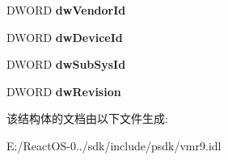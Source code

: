 \begin{DoxyCompactItemize}
\mbox{\label{struct___v_m_r9_monitor_info_a4c1ef7a750debebc2546b5e384e267a9}} 
D\+W\+O\+RD {\bfseries dw\+Vendor\+Id}
\item 
\mbox{\label{struct___v_m_r9_monitor_info_a08ee4c411e11696458145f2146f73a04}} 
D\+W\+O\+RD {\bfseries dw\+Device\+Id}
\item 
\mbox{\label{struct___v_m_r9_monitor_info_a6580b487c125764ab7bda97d605b1473}} 
D\+W\+O\+RD {\bfseries dw\+Sub\+Sys\+Id}
\item 
\mbox{\label{struct___v_m_r9_monitor_info_a48732366c646ef29609acb3649ec8c20}} 
D\+W\+O\+RD {\bfseries dw\+Revision}
\end{DoxyCompactItemize}


该结构体的文档由以下文件生成\+:\begin{DoxyCompactItemize}
\item 
E\+:/\+React\+O\+S-\/0../sdk/include/psdk/vmr9.\+idl\end{DoxyCompactItemize}
